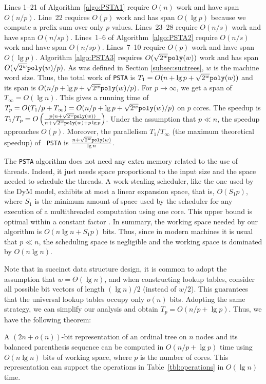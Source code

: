 Lines 1--21 of Algorithm~\ref{algo:PSTA1} require $O(n)$ work and have
span~$O(n/p)$.
Line~22 requires $O(p)$ work and has span $O(\lg p)$ because we compute
a prefix sum over only $p$ values.
Lines~23--28 require $O(n/s)$ work and have span $O(n/sp)$.
Lines~1--6 of Algorithm~\ref{algo:PSTA2} require $O(n/s)$ work and have
span $O(n/sp)$.
Lines~7--10 require $O(p)$ work and have span $O(\lg p)$.
Algorithm \ref{algo:PSTA3} requires $O(\sqrt{2^w}\mathtt{poly}(w))$ work and
has span $O(\sqrt{2^{w}}\mathtt{poly}(w)/p)$. As was defined in Section \ref{subsec:suctrees},
$w$ is the machine word size.
Thus, the total work of {\tt PSTA} is $T_1 = O(n + \lg p + \sqrt{2^w}\mathtt{poly}(w))$
and its span is $O(n/p + \lg p + \sqrt{2^w}\mathtt{poly}(w)/p)$.
For $p \rightarrow \infty$, we get a span of $T_\infty = O(\lg n)$.
This gives a running time of $T_p = O(T_1/p + T_\infty) =
O(n/p + \lg p + \sqrt{2^w}\mathtt{poly}(w)/p)$ on $p$ cores.
The speedup is $T_1/T_p = O\left(\frac{p(n+\sqrt{2^{w}}\mathtt{poly}(w))}{n+\sqrt{2^{w}}\mathtt{poly}(w)+p\lg
p}\right)$. Under the assumption that $p\ll n$, the speedup approaches
$O(p)$. Moreover, the
parallelism $T_1/T_{\infty}$ (the maximum theoretical speedup) of {\tt
PSTA} is $\frac{n+\sqrt{2^{w}}\mathtt{poly}(w)}{\lg n}$.

The {\tt PSTA} algorithm does not need any extra memory related to the use of
threads. Indeed, it just needs space proportional to the input size
and the space needed to schedule the threads. A work-stealing
scheduler, like the one used by the DyM model, exhibits at most a
linear expansion space, that is, $O(S_1p)$, where $S_1$ is the minimum
amount of space used by the scheduler for any execution of a
multithreaded computation using one core. This upper bound is
optimal within a constant factor
\cite{Blumofe:1999:SMC:324133.324234}. In summary, the working space
needed by our algorithm is $O(n\lg n+S_1p)$ bits. Thus, since in modern
machines it is usual that $p\ll n$, the scheduling space is negligible
and the working space is dominated by $O(n\lg n)$.

Note that in succinct data structure design, it is common to adopt the assumption that $w = \Theta(\lg n)$, and when constructing lookup tables, consider all possible bit vectors of length $(\lg n)/2$ (instead of $w/2$).
This guarantees that the universal lookup tables occupy only $o(n)$ bits.
Adopting the same strategy, we can simplify our analysis and obtain
$T_p = O(n/p + \lg p)$.
Thus, we have the following theorem:
\begin{theorem}\label{lem:lg}
A $(2n+o(n))$-bit representation of an ordinal tree on $n$ nodes and its balanced parenthesis sequence can be computed in $O(n/p + \lg p)$ time using $O(n\lg n)$ bits of working space, where $p$ is the number of cores.
This representation can support the operations in Table~\ref{tbl:operations} in $O(\lg n)$ time.
\end{theorem}